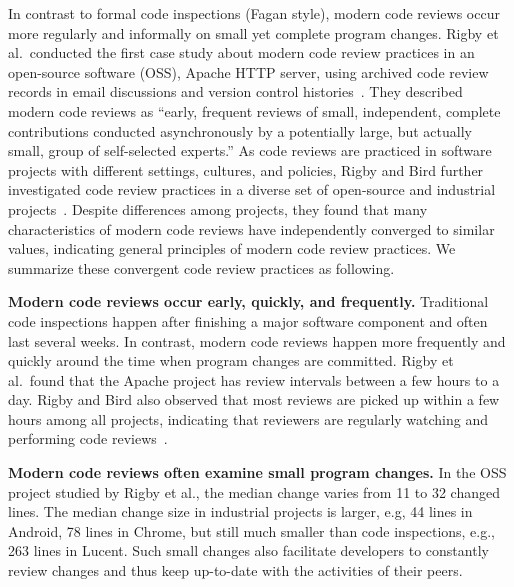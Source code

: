 \documentclass[runningheads,a4paper]{llncs}
\begin{document}
In contrast to formal code inspections (Fagan style), modern code reviews occur more regularly and informally on small yet complete program changes. 
Rigby et al.~conducted the first case study about modern code review practices in an open-source software (OSS), Apache HTTP server, using archived code review records in email discussions and version control histories~\cite{rigby2008open}. They described modern code reviews as ``early, frequent reviews of small, independent, complete contributions conducted asynchronously by a potentially large, but actually small, group of self-selected experts.'' As code reviews are practiced in software projects with different settings, cultures, and policies, Rigby and Bird further investigated code review practices in a diverse set of open-source and industrial projects~\cite{rigby2013convergent}. Despite differences among projects, they found that many characteristics of modern code reviews have independently converged to similar values, indicating general principles of modern code review practices. We summarize these convergent code review practices as following.

{\bf Modern code reviews occur early, quickly, and frequently.} Traditional code inspections happen after finishing a major software component and often last several weeks. In contrast, modern code reviews happen more frequently and quickly around the time when program changes are committed. Rigby et al.~found that the Apache project has review intervals between a few hours to a day. Rigby and Bird also observed that most reviews are picked up within a few hours among all projects, indicating that reviewers are regularly watching and performing code reviews~\cite{rigby2013convergent}.

{\bf Modern code reviews often examine small program changes.} In the OSS project studied by Rigby et al., the median change varies from 11 to 32 changed lines. The median change size in industrial projects is larger, e.g, 44 lines in Android, 78 lines in Chrome, but still much smaller than code inspections, e.g., 263 lines in Lucent. Such small changes also facilitate developers to constantly review changes and thus keep up-to-date with the activities of their peers. 
\end{document}
